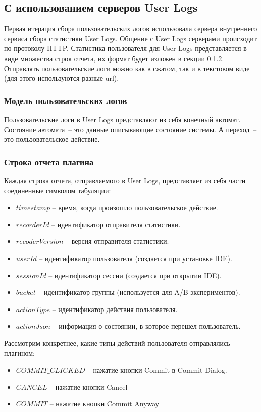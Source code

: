 \subsection{С использованием серверов User Logs}
Первая итерация сбора пользовательских логов использовала сервера внутреннего сервиса сбора статистики User Logs. Общение с User Logs серверами происходит по протоколу HTTP. Статистика пользователя для User Logs представляется в виде множества строк отчета, их формат будет изложен в секции \ref{report-line}. Отправлять пользовательские логи можно как в сжатом, так и в текстовом виде (для этого используются разные url).
\subsubsection{Модель пользовательских логов}
Пользовательские логи в User Logs представляют из себя конечный автомат. Состояние автомата~-- это данные описывающие состояние системы. А переход~-- это пользовательское действие.
\subsubsection{Строка отчета плагина}\label{report-line}
Каждая строка отчета, отправляемого в User Logs, представляет из себя части соединенные символом табуляции:
    \begin{itemize}[label={\textbullet}]
        \item $timestamp$ -- время, когда произошло пользовательское действие.
        \item $recorderId$ -- идентификатор отправителя статистики.
        \item $recoderVersion$ -- версия отправителя статистики.
        \item $userId$ -- идентификатор пользователя (создается при установке IDE).
        \item $sessionId$ -- идентификатор сессии (создается при открытии IDE).
        \item $bucket$ -- идентификатор группы (используется для A/B экспериментов).
        \item $actionType$ -- идентификатор действия пользователя.
        \item $actionJson$ -- информация о состоянии, в которое перешел пользователь.
    \end{itemize}

Рассмотрим конкретнее, какие типы действий пользователя отправлялись плагином:
    \begin{itemize}[label={\textbullet}]
        \item $COMMIT\_CLICKED$ -- нажатие кнопки Commit в Commit Dialog.
        \item $CANCEL$ -- нажатие кнопки Cancel
        \item $COMMIT$ -- нажатие кнопки Commit Anyway
    \end{itemize}

